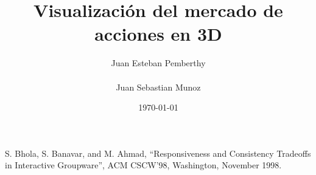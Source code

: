 \documentclass[oneside]{book}
\title {Visualizaci\'{o}n del mercado de acciones en 3D}
\author{Juan Esteban Pemberthy\\\\ Juan Sebastian Munoz}
\date{\today}
\begin{document}
 

\frontmatter
\maketitle

\clearpage

\tableofcontents
\listoffigures




\mainmatter









\backmatter





S. Bhola, S. Banavar, and M. Ahmad, ``Responsiveness and Consistency Tradeoffs in Interactive
Groupware'', ACM CSCW'98, Washington, November 1998.
\end{document}
